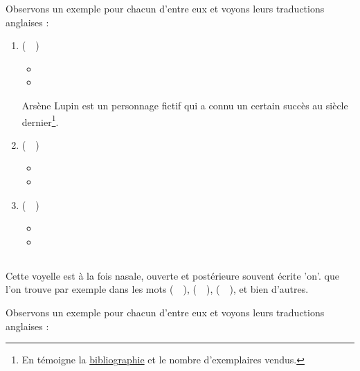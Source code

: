Observons un exemple pour chacun d'entre eux et voyons leurs
traductions anglaises :\par

\begin{enumerate}
\item {} (~~)
  \begin{itemize}
  \item {}
    \item {}
    \end{itemize}
    Arsène Lupin est un personnage fictif qui a connu un certain
    succès au siècle dernier\footnote{En témoigne la
      \href{https://www.amazon.fr/gp/product/B01N7I8WHS/ref=as_li_tl?ie=UTF8&camp=1642&creative=6746&creativeASIN=B01N7I8WHS&linkCode=as2&tag=wwwbecomefree-21&linkId=b8a42c0dbe0bb02385db28679d7e46fd}{bibliographie}
      et le nombre d'exemplaires vendus.}.
\item {} (~~)
  \begin{itemize}
  \item {}
  \item {}
  \end{itemize}
\item {} (~~)
  \begin{itemize}
  \item {}
  \item {}
  \end{itemize}
\end{enumerate}         

\subsection{}\label{subsec:ctfr}

Cette voyelle est à la fois nasale, ouverte et postérieure souvent
écrite 'on'. 
 que l'on trouve par exemple dans les mots
 (~~),  (~~),  (~~), et bien d'autres.

Observons un exemple pour chacun d'entre eux et voyons leurs
traductions anglaises :\par

